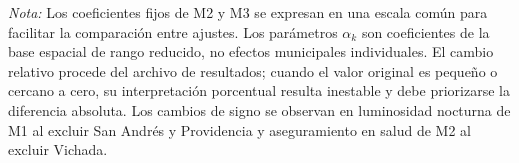 \noindent\textit{Nota:} Los coeficientes fijos de M2 y M3 se expresan en una escala común para facilitar la comparación entre ajustes. Los parámetros $\alpha_k$ son coeficientes de la base espacial de rango reducido, no efectos municipales individuales. El cambio relativo procede del archivo de resultados; cuando el valor original es pequeño o cercano a cero, su interpretación porcentual resulta inestable y debe priorizarse la diferencia absoluta. Los cambios de signo se observan en luminosidad nocturna de M1 al excluir San Andrés y Providencia y aseguramiento en salud de M2 al excluir Vichada.